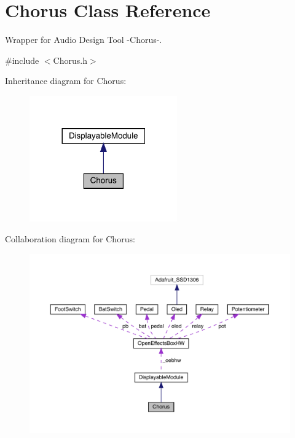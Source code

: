 \hypertarget{class_chorus}{}\section{Chorus Class Reference}
\label{class_chorus}


Wrapper for Audio Design Tool -\/\+Chorus-\/.  




{\ttfamily \#include $<$Chorus.\+h$>$}



Inheritance diagram for Chorus\+:
\nopagebreak
\begin{figure}[H]
\begin{center}
\leavevmode
\includegraphics[width=180pt]{class_chorus__inherit__graph}
\end{center}
\end{figure}


Collaboration diagram for Chorus\+:
\nopagebreak
\begin{figure}[H]
\begin{center}
\leavevmode
\includegraphics[width=350pt]{class_chorus__coll__graph}
\end{center}
\end{figure}
